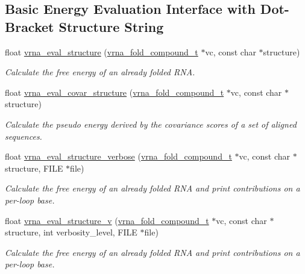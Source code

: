 \subsection*{Basic Energy Evaluation Interface with Dot-\/\+Bracket Structure String}
\begin{DoxyCompactItemize}
\item 
float \mbox{\hyperlink{group__eval_ga58f199f1438d794a265f3b27fc8ea631}{vrna\+\_\+eval\+\_\+structure}} (\mbox{\hyperlink{group__fold__compound_ga1b0cef17fd40466cef5968eaeeff6166}{vrna\+\_\+fold\+\_\+compound\+\_\+t}} $\ast$vc, const char $\ast$structure)
\begin{DoxyCompactList}\small\item\em Calculate the free energy of an already folded R\+NA. \end{DoxyCompactList}\item 
float \mbox{\hyperlink{group__eval_ga6cea75c0eb9857fb59172be54cab09e0}{vrna\+\_\+eval\+\_\+covar\+\_\+structure}} (\mbox{\hyperlink{group__fold__compound_ga1b0cef17fd40466cef5968eaeeff6166}{vrna\+\_\+fold\+\_\+compound\+\_\+t}} $\ast$vc, const char $\ast$structure)
\begin{DoxyCompactList}\small\item\em Calculate the pseudo energy derived by the covariance scores of a set of aligned sequences. \end{DoxyCompactList}\item 
float \mbox{\hyperlink{group__eval_ga0928d699d310178f84ee2351034e5cb5}{vrna\+\_\+eval\+\_\+structure\+\_\+verbose}} (\mbox{\hyperlink{group__fold__compound_ga1b0cef17fd40466cef5968eaeeff6166}{vrna\+\_\+fold\+\_\+compound\+\_\+t}} $\ast$vc, const char $\ast$structure, F\+I\+LE $\ast$file)
\begin{DoxyCompactList}\small\item\em Calculate the free energy of an already folded R\+NA and print contributions on a per-\/loop base. \end{DoxyCompactList}\item 
float \mbox{\hyperlink{group__eval_gab12e6b1226227670322150df018734f8}{vrna\+\_\+eval\+\_\+structure\+\_\+v}} (\mbox{\hyperlink{group__fold__compound_ga1b0cef17fd40466cef5968eaeeff6166}{vrna\+\_\+fold\+\_\+compound\+\_\+t}} $\ast$vc, const char $\ast$structure, int verbosity\+\_\+level, F\+I\+LE $\ast$file)
\begin{DoxyCompactList}\small\item\em Calculate the free energy of an already folded R\+NA and print contributions on a per-\/loop base. \end{DoxyCompactList}\end{DoxyCompactItemize}
